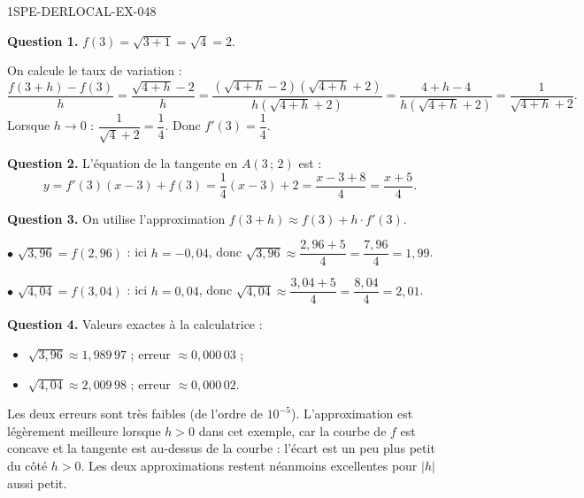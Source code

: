 \begin{corrige}{1SPE-DERLOCAL-EX-048}

\textbf{Question 1.} $f(3) = \sqrt{3 + 1} = \sqrt{4} = 2$.

On calcule le taux de variation :
\[
\frac{f(3+h) - f(3)}{h} = \frac{\sqrt{4+h} - 2}{h} = \frac{(\sqrt{4+h} - 2)(\sqrt{4+h} + 2)}{h(\sqrt{4+h} + 2)} = \frac{4+h-4}{h(\sqrt{4+h} + 2)} = \frac{1}{\sqrt{4+h} + 2}.
\]
Lorsque $h \to 0$ : $\dfrac{1}{\sqrt{4} + 2} = \dfrac{1}{4}$. Donc $\boxed{f'(3) = \dfrac{1}{4}}$.

\textbf{Question 2.} L'équation de la tangente en $A(3\,;\,2)$ est :
\[
y = f'(3)(x - 3) + f(3) = \frac{1}{4}(x - 3) + 2 = \frac{x - 3 + 8}{4} = \boxed{\frac{x + 5}{4}}.
\]

\textbf{Question 3.} On utilise l'approximation $f(3 + h) \approx f(3) + h \cdot f'(3)$.

$\bullet$ $\sqrt{3{,}96} = f(2{,}96)$ : ici $h = -0{,}04$, donc $\sqrt{3{,}96} \approx \dfrac{2{,}96 + 5}{4} = \dfrac{7{,}96}{4} = \boxed{1{,}99}$.

$\bullet$ $\sqrt{4{,}04} = f(3{,}04)$ : ici $h = 0{,}04$, donc $\sqrt{4{,}04} \approx \dfrac{3{,}04 + 5}{4} = \dfrac{8{,}04}{4} = \boxed{2{,}01}$.

\textbf{Question 4.} Valeurs exactes à la calculatrice :
\begin{itemize}
  \item $\sqrt{3{,}96} \approx 1{,}989\,97$ ; erreur $\approx 0{,}000\,03$ ;
  \item $\sqrt{4{,}04} \approx 2{,}009\,98$ ; erreur $\approx 0{,}000\,02$.
\end{itemize}
Les deux erreurs sont très faibles (de l'ordre de $10^{-5}$). L'approximation est légèrement meilleure lorsque $h > 0$ dans cet exemple, car la courbe de $f$ est concave et la tangente est au-dessus de la courbe : l'écart est un peu plus petit du côté $h > 0$. Les deux approximations restent néanmoins excellentes pour $|h|$ aussi petit.

\end{corrige}

